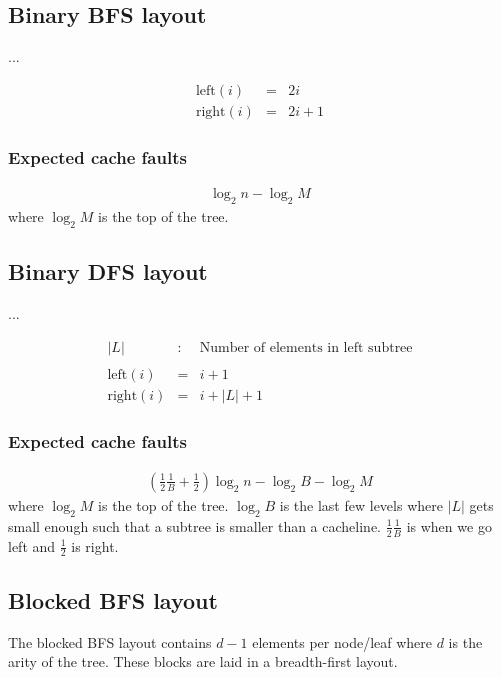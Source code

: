 \subsection{Binary BFS layout}

...

\begin{eqnarray*}
\mathrm{left}(i) & = & 2i \\
\mathrm{right}(i) & = & 2i + 1
\end{eqnarray*}

\subsubsection*{Expected cache faults}

\begin{eqnarray*}
\log_2 n - \log_2 M 
\end{eqnarray*}
where $\log_2 M$ is the top of the tree.

\subsection{Binary DFS layout}

...

\begin{eqnarray*}
|L| & : & \textrm{Number of elements in left subtree} \\
\\
\mathrm{left}(i) & = & i + 1 \\
\mathrm{right}(i) & = & i + |L| + 1
\end{eqnarray*}

\subsubsection*{Expected cache faults}

\begin{eqnarray*}
(\frac{1}{2}\frac{1}{B} + \frac{1}{2})\log_2 n - \log_2 B - \log_2 M 
\end{eqnarray*}
where $\log_2 M$ is the top of the tree. $\log_2 B$ is the last few levels where $|L|$ gets small enough such that a subtree is smaller than a cacheline. $\frac{1}{2}\frac{1}{B}$ is when we go left and $\frac{1}{2}$ is right.

\subsection{Blocked BFS layout}

The blocked BFS layout contains $d - 1$ elements per node/leaf where $d$ is the arity of the tree. These blocks are laid in a breadth-first layout.

